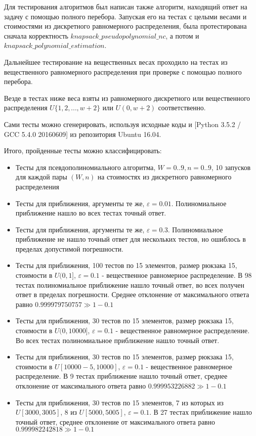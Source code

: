 \documentclass{article}
\begin{document}
Для тестирования алгоритмов был написан также алгоритм, находящий ответ на задачу с помощью полного перебора. Запуская его на тестах с целыми весами и стоимостями из дискретного равномерного распределения, была протестирована сначала корректность $knapsack\_pseudopolynomial\_nc$, а потом и $knapsack\_polynomial\_estimation$.

Дальнейшее тестирование на вещественных весах проходило на тестах из вещественного равномерного распределения при проверке с помощью полного перебора.

Везде в тестах ниже веса взяты из равномерного дискретного или вещественного распределения $U\{1, 2, ..., w + 2\}$ или $U(0, w + 2)$ соответственно.

Сами тесты можно сгенерировать, используя исходные коды и [Python 3.5.2 / GCC 5.4.0 20160609] из репозитория Ubuntu 16.04.

Итого, пройденные тесты можно классифицировать:

\begin{itemize}
	\item Тесты для псевдополиномиального алгоритма, $W = 0..9, n = 0..9$, 10 запусков для каждой пары $(W, n)$ на стоимостях из дискретного равномерного распределения 
	\item Тесты для приближения, аргументы те же, $\varepsilon = 0.01$. Полиномиальное приближение нашло во всех тестах точный ответ.
	\item Тесты для приближения, аргументы те же, $\varepsilon = 0.3$. Полиномиальное приближение не нашло точный ответ для нескольких тестов, но ошиблось в пределах допустимой погрешности.
	\item Тесты для приближения, 100 тестов по 15 элементов, размер рюкзака 15, стоимости в $U(0, 1]$, $\varepsilon = 0.1$ - вещественное равномерное распределение. В 98 тестах полиномиальное приближение нашло точный ответ, во всех получен ответ в пределах погрешности. Среднее отклонение от максимального ответа равно  $0.999979750757 \gg 1 - 0.1$
	\item Тесты для приближения, 30 тестов по 15 элементов, размер рюкзака 15, стоимости в $U(0, 10000]$, $\varepsilon = 0.1$ - вещественное равномерное распределение. Во всех тестах полиномиальное приближение нашло точный ответ.
	\item Тесты для приближения, 30 тестов по 15 элементов, размер рюкзака 15, стоимости в $U[10000-5, 10000]$, $\varepsilon = 0.1$ - вещественное равномерное распределение. В 9 тестах приближение нашло точный ответ, среднее отклонение от максимального ответа равно $0.999953226882 \gg 1 - 0.1$
	\item Тесты для приближения, 30 тестов по 15 элементов, 7 из которых из $U[3000, 3005]$, 8 из $U[5000, 5005]$, $\varepsilon = 0.1$. В 27 тестах приближение нашло точный ответ, среднее отклонение от максимального ответа равно  $0.999982242818 \gg 1 - 0.1$
	
\end{itemize}
\end{document}
